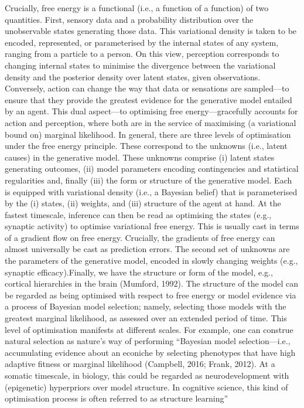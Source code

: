 \cite{friston_world_2021}
Crucially, free energy is a functional (i.e., a function of a function) of two quantities. First, sensory data and a probability distribution over the unobservable states generating those data. This variational density is taken to be encoded, represented, or parameterised by the internal states of any system, ranging from a particle to a person. On this view, perception corresponds to changing internal states to minimise the divergence between the variational density and the posterior density over latent states, given observations. Conversely, action can change the way that data or sensations are sampled—to ensure that they provide the greatest evidence for the generative model entailed by an agent. This dual aspect—to optimising free energy—gracefully accounts for action and perception, where both are in the service of maximising (a variational bound on) marginal likelihood. 
In general, there are three levels of optimisation under the free energy principle. These correspond to the unknowns (i.e., latent causes) in the generative model. These unknowns comprise (i) latent states generating outcomes, (ii) model parameters encoding contingencies and statistical regularities and, finally (iii) the form or structure of the generative model. Each is equipped with variational density (i.e., a Bayesian belief) that is parameterised by the (i) states, (ii) weights, and (iii) structure of the agent at hand.
At the fastest timescale, inference can then be read as optimising the states (e.g., synaptic activity) to optimise variational free energy. This is usually cast in terms of a gradient flow on free energy. Crucially, the gradients of free energy can almost universally be cast as prediction errors.
The second set of unknowns are the parameters of the generative model, encoded in slowly changing weights (e.g., synaptic efficacy).Finally, we have the structure or form of the model, e.g., cortical hierarchies in the brain (Mumford, 1992). The structure of the model can be regarded as being optimised with respect to free energy or model evidence via a process of Bayesian model selection; namely, selecting those models with the greatest marginal likelihood, as assessed over an extended period of time. This level of optimisation manifests at different scales. For example, one can construe natural selection as nature’s way of performing “Bayesian model selection—i.e., accumulating evidence about an econiche by selecting phenotypes that have high adaptive fitness or marginal likelihood (Campbell, 2016; Frank, 2012). At a somatic timescale, in biology, this could be regarded as neurodevelopment with (epigenetic) hyperpriors over model structure. In cognitive science, this kind of optimisation process is often referred to as structure learning”
